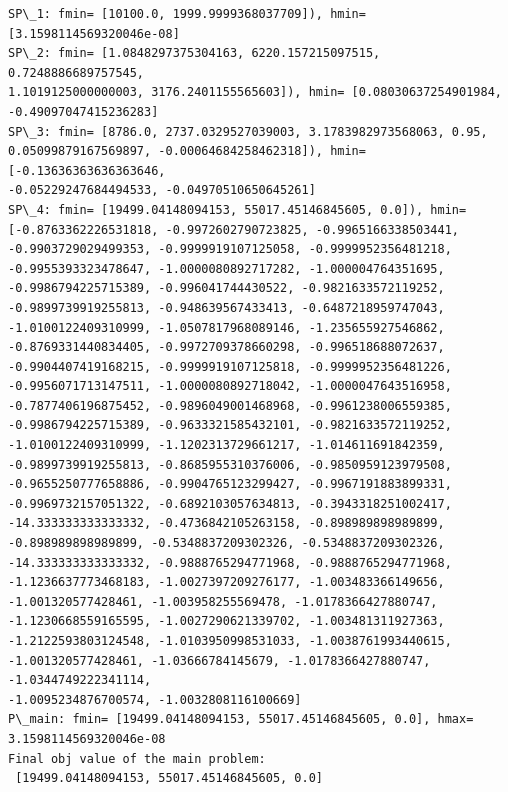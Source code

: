 \documentclass[11pt]{article}
\begin{document}
    \begin{Verbatim}[commandchars=\\\{\}]
SP\_1: fmin= [10100.0, 1999.9999368037709]), hmin= [3.1598114569320046e-08]
SP\_2: fmin= [1.0848297375304163, 6220.157215097515, 0.7248886689757545,
1.1019125000000003, 3176.2401155565603]), hmin= [0.08030637254901984,
-0.49097047415236283]
SP\_3: fmin= [8786.0, 2737.0329527039003, 3.1783982973568063, 0.95,
0.05099879167569897, -0.00064684258462318]), hmin= [-0.13636363636363646,
-0.05229247684494533, -0.04970510650645261]
SP\_4: fmin= [19499.04148094153, 55017.45146845605, 0.0]), hmin=
[-0.8763362226531818, -0.9972602790723825, -0.9965166338503441,
-0.9903729029499353, -0.9999919107125058, -0.9999952356481218,
-0.9955393323478647, -1.0000080892717282, -1.000004764351695,
-0.9986794225715389, -0.996041744430522, -0.9821633572119252,
-0.9899739919255813, -0.948639567433413, -0.6487218959747043,
-1.0100122409310999, -1.0507817968089146, -1.235655927546862,
-0.8769331440834405, -0.9972709378660298, -0.996518688072637,
-0.9904407419168215, -0.9999919107125818, -0.9999952356481226,
-0.9956071713147511, -1.0000080892718042, -1.0000047643516958,
-0.7877406196875452, -0.9896049001468968, -0.9961238006559385,
-0.9986794225715389, -0.9633321585432101, -0.9821633572119252,
-1.0100122409310999, -1.1202313729661217, -1.014611691842359,
-0.9899739919255813, -0.8685955310376006, -0.9850959123979508,
-0.9655250777658886, -0.9904765123299427, -0.9967191883899331,
-0.9969732157051322, -0.6892103057634813, -0.3943318251002417,
-14.333333333333332, -0.4736842105263158, -0.898989898989899,
-0.898989898989899, -0.5348837209302326, -0.5348837209302326,
-14.333333333333332, -0.9888765294771968, -0.9888765294771968,
-1.1236637773468183, -1.0027397209276177, -1.003483366149656,
-1.001320577428461, -1.003958255569478, -1.0178366427880747,
-1.1230668559165595, -1.0027290621339702, -1.003481311927363,
-1.2122593803124548, -1.0103950998531033, -1.0038761993440615,
-1.001320577428461, -1.03666784145679, -1.0178366427880747, -1.0344749222341114,
-1.0095234876700574, -1.0032808116100669]
P\_main: fmin= [19499.04148094153, 55017.45146845605, 0.0], hmax=
3.1598114569320046e-08
Final obj value of the main problem:
 [19499.04148094153, 55017.45146845605, 0.0]
    \end{Verbatim}


    
    
    
\end{document}
